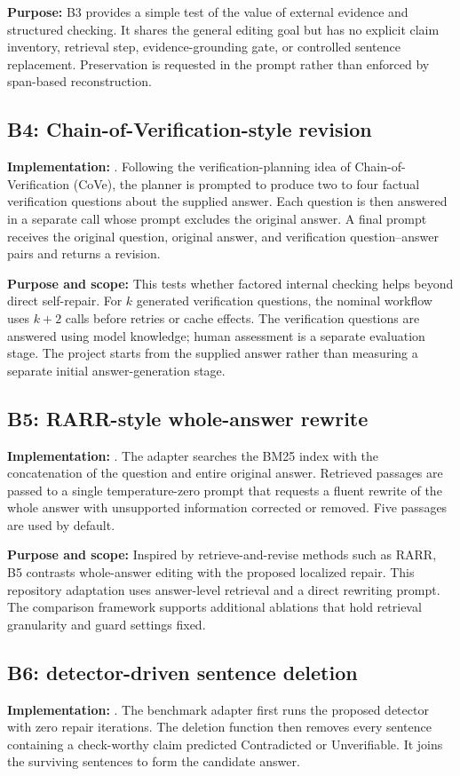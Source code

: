 \documentclass[11pt,a4paper]{article}
\newcommand{\code}[1]{\texttt{\detokenize{#1}}}
\begin{document}
\textbf{Purpose:} B3 provides a simple test of the value of external evidence and structured checking. It shares the general editing goal but has no explicit claim inventory, retrieval step, evidence-grounding gate, or controlled sentence replacement. Preservation is requested in the prompt rather than enforced by span-based reconstruction.

\subsection{B4: Chain-of-Verification-style revision}
\textbf{Implementation:} \code{b4_cove.py}. Following the verification-planning idea of Chain-of-Verification (CoVe), the planner is prompted to produce two to four factual verification questions about the supplied answer. Each question is then answered in a separate call whose prompt excludes the original answer. A final prompt receives the original question, original answer, and verification question--answer pairs and returns a revision.

\textbf{Purpose and scope:} This tests whether factored internal checking helps beyond direct self-repair. For $k$ generated verification questions, the nominal workflow uses $k+2$ calls before retries or cache effects. The verification questions are answered using model knowledge; human assessment is a separate evaluation stage. The project starts from the supplied answer rather than measuring a separate initial answer-generation stage.

\subsection{B5: RARR-style whole-answer rewrite}
\textbf{Implementation:} \code{b5_rarr.py}. The adapter searches the BM25 index with the concatenation of the question and entire original answer. Retrieved passages are passed to a single temperature-zero prompt that requests a fluent rewrite of the whole answer with unsupported information corrected or removed. Five passages are used by default.

\textbf{Purpose and scope:} Inspired by retrieve-and-revise methods such as RARR, B5 contrasts whole-answer editing with the proposed localized repair. This repository adaptation uses answer-level retrieval and a direct rewriting prompt. The comparison framework supports additional ablations that hold retrieval granularity and guard settings fixed.

\subsection{B6: detector-driven sentence deletion}
\textbf{Implementation:} \code{b6_delete_only.py}. The benchmark adapter first runs the proposed detector with zero repair iterations. The deletion function then removes every sentence containing a check-worthy claim predicted Contradicted or Unverifiable. It joins the surviving sentences to form the candidate answer.
\end{document}
